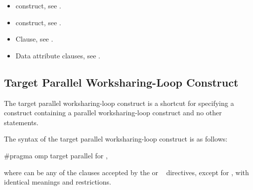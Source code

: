 \crossreferences
\begin{itemize}
\item {} construct, see
.

\item {} construct, see
.

\item {} Clause, see .

\item Data attribute clauses, see
.


\end{itemize}










\subsection{Target Parallel Worksharing-Loop Construct}
\label{subsec:Target Parallel Worksharing-Loop Construct}
\summary
The target parallel worksharing-loop construct is a shortcut for specifying a 
construct containing a parallel worksharing-loop construct and no other statements.

\syntax
\begin{ccppspecific}
The syntax of the target parallel worksharing-loop construct is as follows:

\begin{ompcPragma}
#pragma omp target parallel for \plc{[clause[ [},\plc{] clause] ... ] new-line}
\end{ompcPragma}

where  can be any of the clauses accepted by the  or
~ directives, except for , with identical meanings and restrictions.
\end{ccppspecific}

